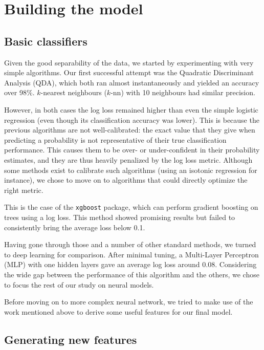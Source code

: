 \documentclass[a4paper,11pt,openany,extrafontsizes,oneside,article,twocolumn]{memoir}
\begin{document}
\chapter{Building the model}

\section{Basic classifiers}

Given the good separability of the data, we started by experimenting
with very simple algorithms. Our first successful attempt was the
Quadratic Discriminant Analysis (QDA), which both ran almost
instantaneously and yielded an accuracy over 98\%. $k$-nearest
neighbours ($k$-nn) with 10 neighbours had similar precision.

However, in both cases the log loss remained higher than even the
simple logistic regression (even though its classification accuracy
was lower). This is because the previous algorithms are not
well-calibrated: the exact value that they give when predicting a
probability is not representative of their true classification
performance. This causes them to be over- or under-confident in their
probability estimates, and they are thus heavily penalized by the log
loss metric. Although some methods exist to calibrate such algorithms
(using an isotonic regression for instance), we chose to move on to
algorithms that could directly optimize the right metric.

This is the case of the \texttt{xgboost} package, which can perform
gradient boosting on trees using a log loss. This method showed
promising results but failed to consistently bring the average loss
below 0.1.

Having gone through those and a number of other standard methods, we
turned to deep learning for comparison. After minimal tuning, a
Multi-Layer Perceptron (MLP) with one hidden layers gave an average
log loss around 0.08. Considering the wide gap between the performance
of this algorithm and the others, we chose to focus the rest of our
study on neural models.

Before moving on to more complex neural network, we tried to make use
of the work mentioned above to derive some useful features for our
final model.

\section{Generating new features}
\end{document}
